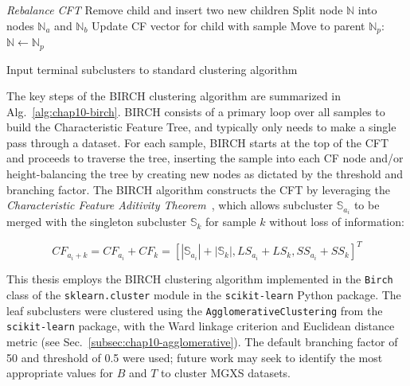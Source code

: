 \begin{algorithm}[h!]
\begin{algorithmic}[1]
    \item[]

    \Statex \hspace{0.2in} \textit{Rebalance CFT}
        \State Remove child and insert two new children
          \State Split node $\mathbb{N}$ into nodes $\mathbb{N}_{a}$ and $\mathbb{N}_{b}$
        \EndIf
      \Else
        \State Update CF vector for child with sample         
      \EndIf
	  \State Move to parent $\mathbb{N}_{p}$: $\mathbb{N} \leftarrow \mathbb{N}_{p}$
    \EndFor

  \item[]

  \EndFor

  \item[]

  \State Input terminal subclusters to standard clustering algorithm 
\end{algorithmic}
\end{algorithm}

The key steps of the BIRCH clustering algorithm are summarized in Alg.~\ref{alg:chap10-birch}. BIRCH consists of a primary loop over all samples to build the Characteristic Feature Tree, and typically only needs to make a single pass through a dataset. For each sample, BIRCH starts at the top of the CFT and proceeds to traverse the tree, inserting the sample into each CF node and/or height-balancing the tree by creating new nodes as dictated by the threshold and branching factor. The BIRCH algorithm constructs the CFT by leveraging the \textit{Characteristic Feature Aditivity Theorem}~\cite{zhang1996birch}, which allows subcluster $\mathbb{S}_{a_{i}}$ to be merged with the singleton subcluster $\mathbb{S}_{k}$ for sample $k$ without loss of information:

\begin{equation}
\label{eqn:chap10-birch-cf-additivity}
CF_{a_{i}+k} = CF_{a_{i}} + CF_{k} = \left[|\mathbb{S}_{a_{i}}| + |\mathbb{S}_{k}|, LS_{a_{i}} + LS_{k}, SS_{a_{i}} + SS_{k}\right]^{T}
\end{equation}

This thesis employs the BIRCH clustering algorithm implemented in the \texttt{Birch} class of the \texttt{sklearn.cluster} module in the \texttt{scikit-learn} Python package. The leaf subclusters were clustered using the \texttt{AgglomerativeClustering} from the \texttt{scikit-learn} package, with the Ward linkage criterion and Euclidean distance metric (see Sec.~\ref{subsec:chap10-agglomerative}). The default branching factor of 50 and threshold of 0.5 were used; future work may seek to identify the most appropriate values for $B$ and $T$ to cluster \ac{MGXS} datasets.

